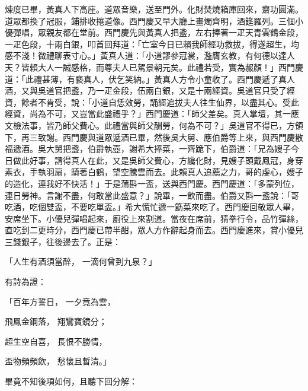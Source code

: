 \begin{showcontents}{}
煉度已畢，黃真人下高座。道眾音樂，送至門外。化財焚燒箱庫回來，齋功圓滿。道眾都換了冠服，鋪排收捲道像。西門慶又早大廳上畫燭齊明，酒筵羅列。三個小優彈唱，眾親友都在堂前。西門慶先與黃真人把盞，左右捧著一疋天青雲鶴金段，一疋色段，十兩白銀，叩首回拜道：「亡室今日已賴我師經功救拔，得遂超生，均感不淺！微禮聊表寸心。」黃真人道：「小道謬參冠裳，濫膺玄教，有何德以達人天？皆賴大人一誠感格，而尊夫人已駕景朝元矣。此禮若受，實為赧顏！」西門慶道：「此禮甚薄，有褻真人，伏乞笑納。」黃真人方令小童收了。西門慶遞了真人酒，又與吳道官把盞，乃一疋金段，伍兩白銀，又是十兩經資。吳道官只受了經資，餘者不肯受，說：「小道自恁效勞，誦經追拔夫人往生仙界，以盡其心。受此經資，尚為不可，又豈當此盛禮乎？」西門慶道：「師父差矣。真人掌壇，其一應文檢法事，皆乃師父費心。此禮當與師父酬勞，何為不可？」吳道官不得已，方領下，再三致謝。西門慶與道眾遞酒已畢，然後吳大舅、應伯爵等上來，與西門慶散福遞酒。吳大舅把盞，伯爵執壺，謝希大捧菜，一齊跪下，伯爵道：「兄為嫂子今日做此好事，請得真人在此，又是吳師父費心，方纔化財，見嫂子頭戴鳳冠，身穿素衣，手執羽扇，騎著白鶴，望空騰雲而去。此賴真人追薦之力，哥的虔心，嫂子的造化，連我好不快活！」于是蒲斟一盃，送與西門慶。西門慶道：「多蒙列位，連日勞神。言謝不盡，何敢當此盛意？」說畢，一飲而盡。伯爵又斟一盞說：「哥吃酒，吃個雙盃，不要吃單盃。」希大慌忙遞一筯菜來吃了。西門慶回敬眾人畢，安席坐下。小優兒彈唱起來，廚役上來割道。當夜在席前，猜拳行令，品竹彈絲，直吃到二更時分，西門慶已帶半酣，眾人方作辭起身而去。西門慶進來，賞小優兒三錢銀子，往後邊去了。正是：

「人生有酒須當醉，  一滴何曾到九泉？」

有詩為證：

「百年方誓日，  一夕竟為雲，

飛鳳金鋼落，  翔鸞寶鏡分；

超生空自喜，  長恨不勝情，

盃物頻頻飲，  愁懷且暫清。」

畢竟不知後項如何，且聽下回分解：




\end{showcontents}


